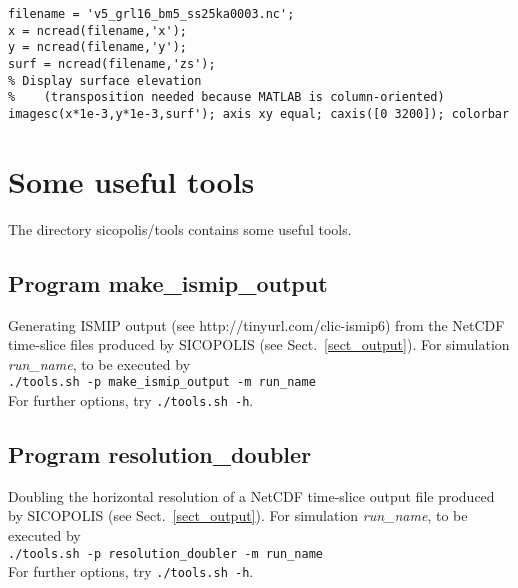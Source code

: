 \documentclass[12pt,a4paper]{article}
\begin{document}
\noindent\hspace*{5mm}\verb+filename = 'v5_grl16_bm5_ss25ka0003.nc';+
\\[-0.5ex]
\hspace*{5mm}\verb+x = ncread(filename,'x');+
\\[-0.5ex]
\hspace*{5mm}\verb+y = ncread(filename,'y');+
\\[-0.5ex]
\hspace*{5mm}\verb+surf = ncread(filename,'zs');+
\\[-0.5ex]
\hspace*{5mm}\verb+% Display surface elevation+
\\[-0.5ex]
\hspace*{5mm}\verb+%    (transposition needed because MATLAB is column-oriented)+
\\[-0.5ex]
\hspace*{5mm}\verb+imagesc(x*1e-3,y*1e-3,surf'); axis xy equal; caxis([0 3200]); colorbar+



\section{Some useful tools}
\label{sect_tools}

The directory sicopolis/tools contains some useful tools.

\subsection{Program make\_ismip\_output}
\label{ssect_make_ismip_output}

Generating ISMIP output (see http://tinyurl.com/clic-ismip6) from the NetCDF time-slice files produced by SICOPOLIS (see Sect.~\ref{sect_output}). For simulation \emph{run\_name}, to be executed by\\
\hspace*{10mm}\verb+./tools.sh -p make_ismip_output -m run_name+\\
For further options, try \verb+./tools.sh -h+.

\subsection{Program resolution\_doubler}
\label{ssect_resolution_doubler}

Doubling the horizontal resolution of a NetCDF time-slice output file produced by SICOPOLIS (see Sect.~\ref{sect_output}). For simulation \emph{run\_name}, to be executed by\\
\hspace*{10mm}\verb+./tools.sh -p resolution_doubler -m run_name+\\
For further options, try \verb+./tools.sh -h+.
\end{document}
